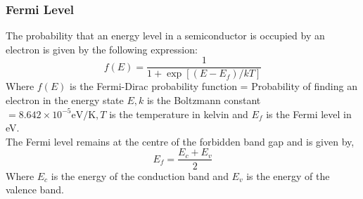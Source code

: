 \subsubsection{Fermi Level}
The probability that an energy level in a semiconductor is occupied by an electron is given by the following expression:
\begin{equation}
f(E)=\frac{1}{1+\exp \left[\left(E-E_{f}\right) / k T\right]}
\end{equation}
Where $f(E)$ is the Fermi-Dirac probability function = Probability of finding an electron in the energy state $E, k$ is the Boltzmann constant $=8.642 \times 10^{-5} \mathrm{eV} / \mathrm{K}, T$ is the temperature in kelvin and $E_{f}$ is the Fermi level in eV.\\
The Fermi level remains at the centre of the forbidden band gap and is given by,
\begin{equation}
E_{f}=\frac{E_{c}+E_{v}}{2}
\end{equation}
Where $E_{c}$ is the energy of the conduction band and $E_{v}$ is the energy of the valence band.
